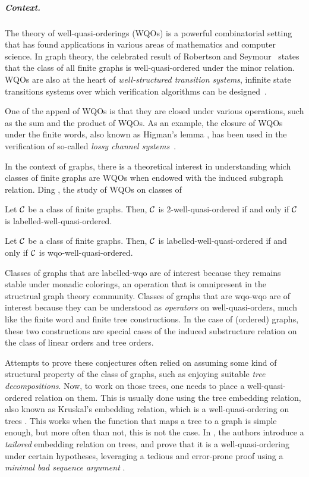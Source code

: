 \subparagraph{Context.} The theory of well-quasi-orderings (WQOs) is a powerful
combinatorial setting that has found applications in various areas of
mathematics and computer science. In graph theory, the celebrated result of
Robertson and Seymour~\cite{ROBSEY04} states that the class of all finite
graphs is well-quasi-ordered under the minor relation. WQOs are also at the
heart of \emph{well-structured transition systems}, infinite state transitions
systems over which verification algorithms can be
designed~\cite{ABDU96,ABDU98}.

One of the appeal of WQOs is that they are closed under various operations,
such as the sum and the product of WQOs. As an example, the closure of WQOs
under the finite words, also known as Higman's lemma \cite{HIG52}, has been
used in the verification of so-called \emph{lossy channel
systems}~\cite{ABDU93}. 

In the context of graphs, there is a theoretical interest in understanding
which classes of finite graphs are WQOs when endowed with the induced subgraph
relation. Ding \cite{DING92}, the study of WQOs on classes of


\begin{conjecture}
    \label{pouzet1:conj}
    Let $\mathcal{C}$ be a class of finite graphs.
    Then, $\mathcal{C}$ is 2-well-quasi-ordered
    if and only if
    $\mathcal{C}$ is labelled-well-quasi-ordered.
\end{conjecture}

\begin{conjecture}
    \label{pouzet2:conj}
    Let $\mathcal{C}$ be a class of finite graphs.
    Then, $\mathcal{C}$ is labelled-well-quasi-ordered
    if and only if
    $\mathcal{C}$ is wqo-well-quasi-ordered.
\end{conjecture}

Classes of graphs that are labelled-wqo are of interest because they remains
stable under monadic colorings, an operation that is omnipresent in the
structrual graph theory community. Classes of graphs that are wqo-wqo are of
interest because they can be understood as \emph{operators} on
well-quasi-orders, much like the finite word and finite tree constructions. In
the case of (ordered) graphs, these two constructions are special cases of the
induced substructure relation on the class of linear orders and tree orders.

Attempts to prove these conjectures often relied on assuming some kind of
structural property of the class of graphs, such as enjoying suitable
\emph{tree decompositions}. Now, to work on those trees, one needs to place a
well-quasi-ordered relation on them. This is usually done using the tree
embedding relation, also known as Kruskal's embedding relation, which is a
well-quasi-ordering on trees \cite{KRU72}. This works when the function that
maps a tree to a graph is simple enough, but more often than not, this is not
the case. In \cite{DRT10}, the authors introduce a \emph{tailored} embedding
relation on trees, and prove that it is a well-quasi-ordering under certain
hypotheses, leveraging a tedious and error-prone proof using a \emph{minimal
bad sequence argument} \cite{NASH65}. 

